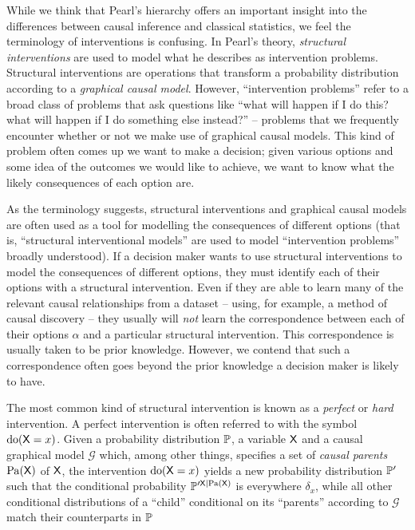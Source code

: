 \documentclass{article}
\begin{document}
While we think that Pearl's hierarchy offers an important insight into the differences between causal inference and classical statistics, we feel the terminology of interventions is confusing. In Pearl's theory, \emph{structural interventions} are used to model what he describes as intervention problems. Structural interventions are operations that transform a probability distribution according to a \emph{graphical causal model}. However, ``intervention problems'' refer to a broad class of problems that ask questions like ``what will happen if I do this? what will happen if I do something else instead?'' -- problems that we frequently encounter whether or not we make use of graphical causal models. This kind of problem often comes up we want to make a decision; given various options and some idea of the outcomes we would like to achieve, we want to know what the likely consequences of each option are.

As the terminology suggests, structural interventions and graphical causal models are often used as a tool for modelling the consequences of different options (that is, ``structural interventional models'' are used to model ``intervention problems'' broadly understood). If a decision maker wants to use structural interventions to model the consequences of different options, they must identify each of their options with a structural intervention. Even if they are able to learn many of the relevant causal relationships from a dataset -- using, for example, a method of causal discovery -- they usually will \emph{not} learn the correspondence between each of their options $\alpha$ and a particular structural intervention. This correspondence is usually taken to be prior knowledge. However, we contend that such a correspondence often goes beyond the prior knowledge a decision maker is likely to have.

The most common kind of structural intervention is known as a \emph{perfect} or \emph{hard} intervention. A perfect intervention is often referred to with the symbol $\mathrm{do}(\mathsf{X}=x)$. Given a probability distribution $\mathbb{P}$, a variable $\mathsf{X}$ and a causal graphical model $\mathcal{G}$ which, among other things, specifies a set of \emph{causal parents} $\mathrm{Pa}(\mathsf{X})$ of $\mathsf{X}$, the intervention $\mathrm{do}(\mathsf{X}=x)$ yields a new probability distribution $\mathbb{P}'$ such that the conditional probability $\mathbb{P}^{\prime \mathsf{X}|\mathrm{Pa}(\mathsf{X})}$ is everywhere $\delta_x$, while all other conditional distributions of a ``child'' conditional on its ``parents'' according to $\mathcal{G}$ match their counterparts in $\mathbb{P}$ \citep[Sec. 1.3.1]{pearl_causality:_2009}
\end{document}
